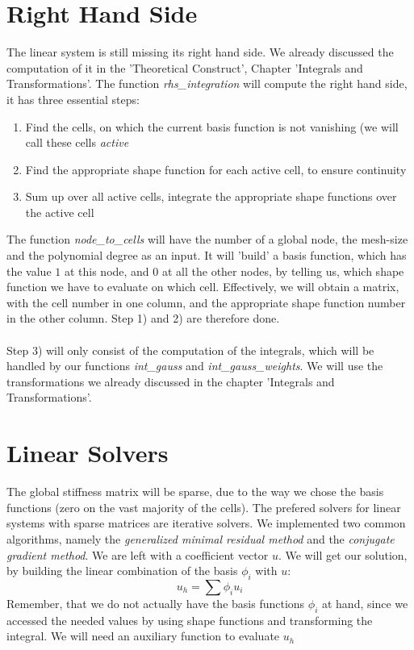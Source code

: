 \documentclass[a4paper,12pt]{article}
\begin{document}
\section{Right Hand Side}
The linear system is still missing its right hand side. We already discussed the computation of it in the 'Theoretical Construct', Chapter 'Integrals and Transformations'. The function \textit{rhs\_integration} will compute the right hand side, it has three essential steps:
\begin{enumerate}
\item Find the cells, on which the current basis function is not vanishing (we will call these cells \textit{active}
\item Find the appropriate shape function for each active cell, to ensure continuity
\item Sum up over all active cells, integrate the appropriate shape functions over the active cell 
\end{enumerate}
The function \textit{node\_to\_cells} will have the number of a global node, the mesh-size and the polynomial degree as an input. It will 'build' a basis function, which has the value $1$ at this node, and $0$ at all the other nodes, by telling us, which shape function we have to evaluate on which cell. Effectively, we will obtain a matrix, with the cell number in one column, and the appropriate shape function number in the other column. Step 1) and 2) are therefore done.\\
\\
Step 3) will only consist of the computation of the integrals, which will be handled by our functions \textit{int\_gauss} and \textit{int\_gauss\_weights}. We will use the transformations we already discussed in the chapter 'Integrals and Transformations'.

\section{Linear Solvers}
The global stiffness matrix will be sparse, due to the way we chose the basis functions (zero on the vast majority of the cells). The prefered solvers for linear systems with sparse matrices are iterative solvers. We implemented two common algorithms, namely the \textit{generalized minimal residual method} and the \textit{conjugate gradient method}. 
We are left with a coefficient vector $u$. We will get our solution, by building the linear combination of the basis ${\phi_i}$ with $u$: 
\[u_h = \sum \phi_i u_i\]
Remember, that we do not actually have the basis functions $\phi_i$ at hand, since we accessed the needed values by using shape functions and transforming the integral. We will need an auxiliary function to evaluate $u_h$
\end{document}
